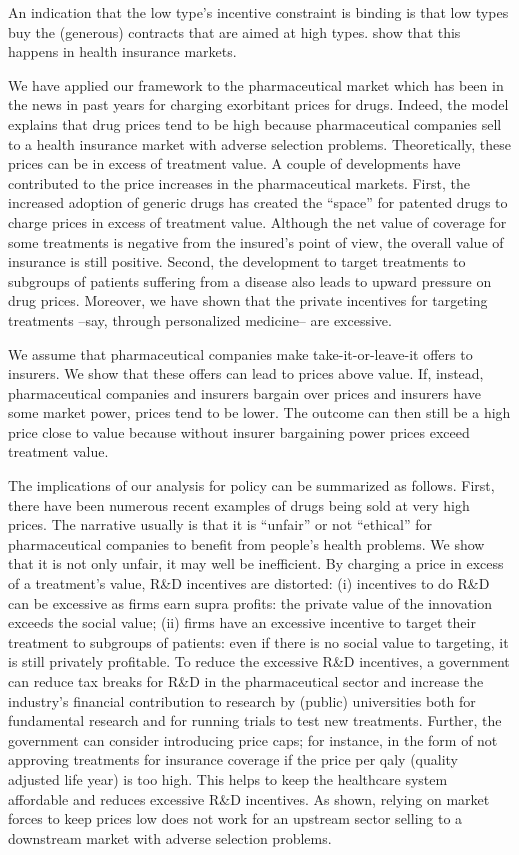 \documentclass[a4paper,12pt]{article}
\begin{document}
An indication that the low type's incentive constraint is binding is that low types buy the (generous) contracts that are aimed at high types. \cite{handel-2015-healt-insur-human} show that this happens in health insurance markets. 

We have applied our framework to the pharmaceutical market which has been in the news in past years for charging exorbitant prices for drugs. Indeed, the model explains that drug prices tend to be high because pharmaceutical companies sell to a health insurance market with adverse selection problems. Theoretically, these prices can be in excess of treatment value. A couple of developments have contributed to the price increases in the pharmaceutical markets. First, the increased adoption of generic drugs has created the ``space'' for patented drugs to charge prices in excess of treatment value. Although the net value of coverage for some treatments is negative from the insured's point of view, the overall value of insurance is still positive. Second, the development to target treatments to subgroups of patients suffering from a disease also leads to upward pressure on drug prices. Moreover, we have shown that the private incentives for targeting treatments --say, through personalized medicine-- are excessive.

We assume that pharmaceutical companies make take-it-or-leave-it offers to insurers. We show that these offers can lead to prices above value. If, instead, pharmaceutical companies and insurers bargain over prices and insurers have some market power, prices tend to be lower. The outcome can then still be a high price close to value because without insurer bargaining power prices exceed treatment value.

The implications of our analysis for policy can be summarized as follows. First, there have been numerous recent examples of drugs being sold at very high prices. The narrative usually is that it is ``unfair'' or not ``ethical'' for pharmaceutical companies to benefit from people's health problems. We show that it is not only unfair, it may well be inefficient. By charging a price in excess of a treatment's value, R\&D incentives are distorted: (i) incentives to do R\&D can be excessive as firms earn supra profits: the private value of the innovation exceeds the social value; (ii) firms have an excessive incentive to target their treatment to subgroups of patients: even if there is no social value to targeting, it is still privately profitable. To reduce the excessive R\&D incentives, a government can reduce tax breaks for R\&D in the pharmaceutical sector and increase the industry's financial contribution to research by (public) universities both for fundamental research and for running trials to test new treatments. Further, the government can consider introducing price caps; for instance, in the form of not approving treatments for insurance coverage if the price per qaly (quality adjusted life year) is too high. This helps to keep the healthcare system affordable and reduces excessive R\&D incentives. As shown, relying on market forces to keep prices low does not work for an upstream sector selling to a downstream market with adverse selection problems.
\end{document}
